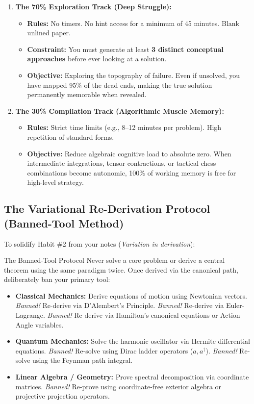 \documentclass[11pt,a4paper]{article}
\begin{document}
\begin{enumerate}
    \item \textbf{The 70\% Exploration Track (Deep Struggle):}
    \begin{itemize}
        \item \textbf{Rules:} No timers. No hint access for a minimum of 45 minutes. Blank unlined paper.
        \item \textbf{Constraint:} You must generate at least \textbf{3 distinct conceptual approaches} before ever looking at a solution.
        \item \textbf{Objective:} Exploring the topography of failure. Even if unsolved, you have mapped 95\% of the dead ends, making the true solution permanently memorable when revealed.
    \end{itemize}
    
    \item \textbf{The 30\% Compilation Track (Algorithmic Muscle Memory):}
    \begin{itemize}
        \item \textbf{Rules:} Strict time limits (e.g., 8--12 minutes per problem). High repetition of standard forms.
        \item \textbf{Objective:} Reduce algebraic cognitive load to absolute zero. When intermediate integrations, tensor contractions, or tactical chess combinations become autonomic, 100\% of working memory is free for high-level strategy.
    \end{itemize}
\end{enumerate}

\subsection{The Variational Re-Derivation Protocol (Banned-Tool Method)}
To solidify Habit \#2 from your notes (\textit{Variation in derivation}):

\begin{principlebox}{The Banned-Tool Protocol}
Never solve a core problem or derive a central theorem using the same paradigm twice. Once derived via the canonical path, deliberately ban your primary tool:
\begin{itemize}
    \item \textbf{Classical Mechanics:} Derive equations of motion using Newtonian vectors. \textit{Banned!} Re-derive via D'Alembert's Principle. \textit{Banned!} Re-derive via Euler-Lagrange. \textit{Banned!} Re-derive via Hamilton's canonical equations or Action-Angle variables.
    \item \textbf{Quantum Mechanics:} Solve the harmonic oscillator via Hermite differential equations. \textit{Banned!} Re-solve using Dirac ladder operators ($a, a^\dagger$). \textit{Banned!} Re-solve using the Feynman path integral.
    \item \textbf{Linear Algebra / Geometry:} Prove spectral decomposition via coordinate matrices. \textit{Banned!} Re-prove using coordinate-free exterior algebra or projective projection operators.
\end{itemize}
\end{principlebox}
\end{document}
